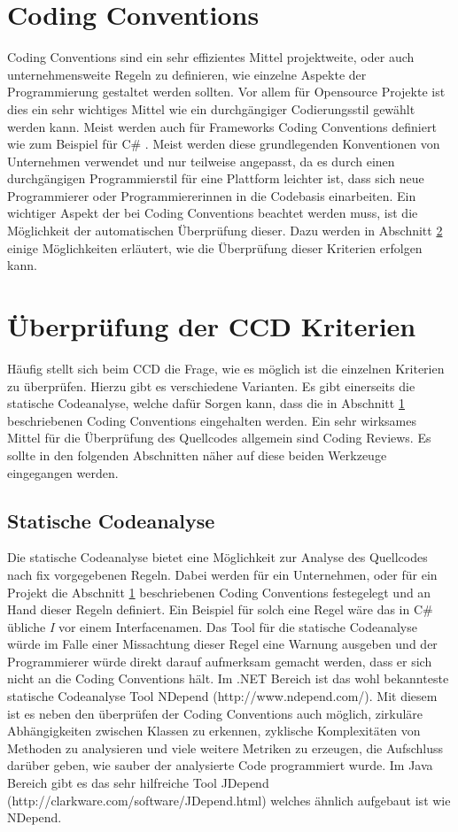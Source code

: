 \section{Coding Conventions}
\label{cha:CodingConventions}
Coding Conventions sind ein sehr effizientes Mittel projektweite, oder auch unternehmensweite Regeln zu definieren, wie einzelne Aspekte der Programmierung gestaltet werden sollten. Vor allem für Opensource Projekte ist dies ein sehr wichtiges Mittel wie ein durchgängiger Codierungsstil gewählt werden kann. Meist werden auch für Frameworks Coding Conventions definiert wie zum Beispiel für C\# \cite{CSHARPCoding}. Meist werden diese grundlegenden Konventionen von Unternehmen verwendet und nur teilweise angepasst, da es durch einen durchgängigen Programmierstil für eine Plattform leichter ist, dass sich neue Programmierer oder Programmiererinnen in die Codebasis einarbeiten. Ein wichtiger Aspekt der bei Coding Conventions beachtet werden muss, ist die Möglichkeit der automatischen Überprüfung dieser. Dazu werden in Abschnitt \ref{cha:CheckingCCDCriterias} einige Möglichkeiten erläutert, wie die Überprüfung dieser Kriterien erfolgen kann.

 
\section{Überprüfung der CCD Kriterien}
\label{cha:CheckingCCDCriterias}
\SuperPar Häufig stellt sich beim CCD die Frage, wie es möglich ist die einzelnen Kriterien zu überprüfen. Hierzu gibt es verschiedene Varianten. Es gibt einerseits die statische Codeanalyse, welche dafür Sorgen kann, dass die in Abschnitt \ref{cha:CodingConventions} beschriebenen Coding Conventions eingehalten werden. Ein sehr wirksames Mittel für die Überprüfung des Quellcodes allgemein sind Coding Reviews. Es sollte in den folgenden Abschnitten näher auf diese beiden Werkzeuge eingegangen werden.

\subsection{Statische Codeanalyse}
\SuperPar Die statische Codeanalyse bietet eine Möglichkeit zur Analyse des Quellcodes nach fix vorgegebenen Regeln. Dabei werden für ein Unternehmen, oder für ein Projekt die Abschnitt \ref{cha:CodingConventions} beschriebenen Coding Conventions festegelegt und an Hand dieser Regeln definiert. Ein Beispiel für solch eine Regel wäre das in C\# übliche \textit{I} vor einem Interfacenamen. Das Tool für die statische Codeanalyse würde im Falle einer Missachtung dieser Regel eine Warnung ausgeben und der Programmierer würde direkt darauf aufmerksam gemacht werden, dass er sich nicht an die Coding Conventions hält. Im .NET Bereich ist das wohl bekannteste statische Codeanalyse Tool NDepend (http://www.ndepend.com/). Mit diesem ist es neben den überprüfen der Coding Conventions auch möglich, zirkuläre Abhängigkeiten zwischen Klassen zu erkennen, zyklische Komplexitäten von Methoden zu analysieren und viele weitere Metriken zu erzeugen, die Aufschluss darüber geben, wie sauber der analysierte Code programmiert wurde. Im Java Bereich gibt es das sehr hilfreiche Tool JDepend (http://clarkware.com/software/JDepend.html) welches ähnlich aufgebaut ist wie NDepend.

